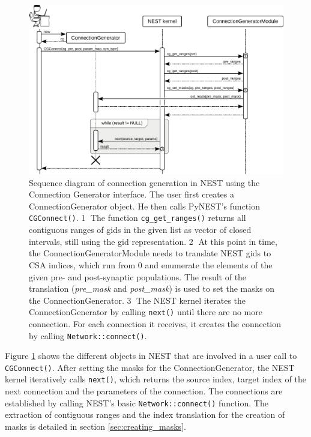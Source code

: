 \documentclass{frontiersSCNS} %
\begin{document}
\begin{figure}[ht]
\centering
\includegraphics[scale=.8]{figures/sequence_diagram_nest.pdf}
\caption{Sequence diagram of connection generation in NEST using the
  Connection Generator interface. The user first creates a
  ConnectionGenerator object. He then calls PyNEST's function
  \texttt{CGConnect()}. \textcircled{\footnotesize 1} The function
  \texttt{cg\_get\_ranges()} returns all contiguous ranges of gids in
  the given list as vector of closed intervals, still using the gid
  representation. \textcircled{\footnotesize 2} At this point in time,
  the ConnectionGeneratorModule needs to translate NEST gids to CSA
  indices, which run from 0 and enumerate the elements of the given
  pre- and post-synaptic populations. The result of the translation
  (\emph{pre\_mask} and \emph{post\_mask}) is used to set the masks on
  the ConnectionGenerator. \textcircled{\footnotesize 3} The NEST
  kernel iterates the ConnectionGenerator by calling \texttt{next()}
  until there are no more connection. For each connection it receives,
  it creates the connection by calling
  \texttt{Network::connect()}.}\label{fig:sequence_diagram_nest}
\end{figure}

Figure \ref{fig:sequence_diagram_nest} shows the different objects in
NEST that are involved in a user call to \texttt{CGConnect()}. After
setting the masks for the ConnectionGenerator, the NEST kernel
iteratively calls \texttt{next()}, which returns the source index,
target index of the next connection and the parameters of the
connection. The connections are established by calling NEST's basic
\texttt{Network::connect()} function. The extraction of contiguous
ranges and the index translation for the creation of masks is detailed
in section \ref{sec:creating_masks}.
\end{document}
